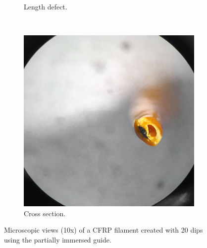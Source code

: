 \begin{figure}[h!]
\begin{subfigure}[b]{0.3\textwidth}
                \caption{Length defect.}
                \label{fig:20-og-defect}
        \end{subfigure}
        ~ %
        \begin{subfigure}[b]{0.3\textwidth}
                \includegraphics[width=\textwidth]{./figures/20-og-end}
                \caption{Cross section.}
                \label{fig:20-og-end}
        \end{subfigure}
        \caption{Microscopic views (10x) of a CFRP filament created with 20 dips using the partially immersed guide.}\label{fig:20-og}
\end{figure}


